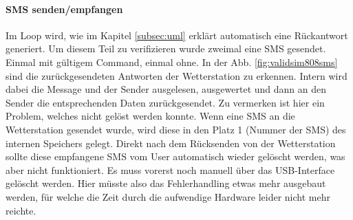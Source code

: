 \paragraph{SMS senden/empfangen}
\label{para:validsmssendenempfangen}
\begin{minipage}[b][6.5cm][t]{0.48\textwidth}
Im Loop wird, wie im Kapitel \ref{subsec:uml} erklärt automatisch eine Rückantwort generiert. Um diesem Teil zu verifizieren wurde zweimal eine SMS gesendet. Einmal mit gültigem Command, einmal ohne. In der Abb. \ref{fig:validsim808sms} sind die zurückgesendeten Antworten der Wetterstation zu erkennen. Intern wird dabei die Message und der Sender ausgelesen, ausgewertet und dann an den Sender die entsprechenden Daten zurückgesendet. Zu vermerken ist hier ein Problem, welches nicht gelöst werden konnte. Wenn eine SMS an die Wetterstation gesendet wurde, wird diese in den Platz 1 (Nummer der SMS) des internen Speichers gelegt. Direkt nach dem Rücksenden von der Wetterstation sollte diese empfangene SMS vom User automatisch wieder gelöscht werden, was aber nicht funktioniert. Es muss vorerst noch manuell über das USB-Interface gelöscht werden. Hier müsste also das Fehlerhandling etwas mehr ausgebaut werden, für welche die Zeit durch die aufwendige Hardware leider nicht mehr reichte.\\
\end{minipage}

